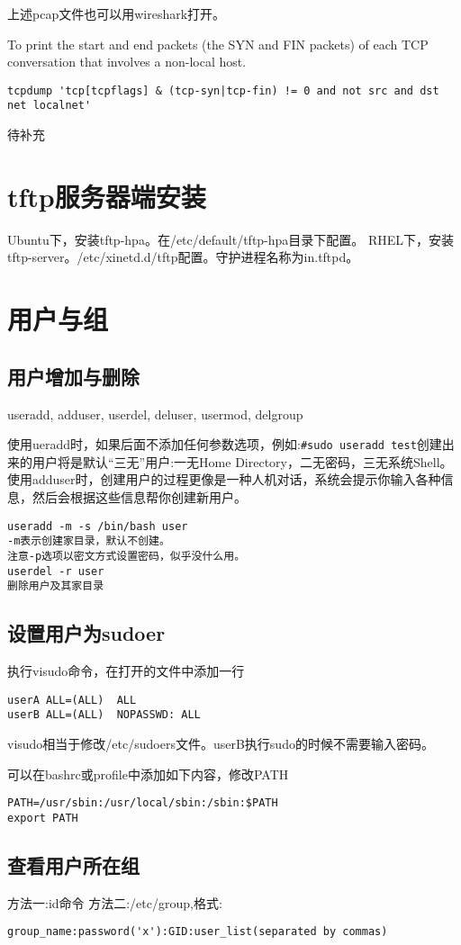 上述pcap文件也可以用wireshark打开。


 To print the start and end packets (the SYN and FIN packets) of each TCP conversation that involves a non-local host.
\begin{verbatim}
tcpdump 'tcp[tcpflags] & (tcp-syn|tcp-fin) != 0 and not src and dst net localnet'
\end{verbatim}

待补充
\section{tftp服务器端安装}
Ubuntu下，安装tftp-hpa。在/etc/default/tftp-hpa目录下配置。
RHEL下，安装tftp-server。/etc/xinetd.d/tftp配置。守护进程名称为in.tftpd。
\section{用户与组}

\subsection{用户增加与删除}
useradd, adduser, userdel, deluser, usermod, delgroup

使用ueradd时，如果后面不添加任何参数选项，例如:\verb+#sudo useradd test+创建出来的用户将是默认“三无”用户:一无Home Directory，二无密码，三无系统Shell。
使用adduser时，创建用户的过程更像是一种人机对话，系统会提示你输入各种信息，然后会根据这些信息帮你创建新用户。
\begin{verbatim}
useradd -m -s /bin/bash user 
-m表示创建家目录，默认不创建。
注意-p选项以密文方式设置密码，似乎没什么用。
userdel -r user
删除用户及其家目录
\end{verbatim}

\subsection{设置用户为sudoer}
执行visudo命令，在打开的文件中添加一行
\begin{verbatim}
userA ALL=(ALL)  ALL
userB ALL=(ALL)  NOPASSWD: ALL
\end{verbatim}
visudo相当于修改/etc/sudoers文件。userB执行sudo的时候不需要输入密码。

可以在bashrc或profile中添加如下内容，修改PATH
\begin{verbatim}
PATH=/usr/sbin:/usr/local/sbin:/sbin:$PATH
export PATH
\end{verbatim}

\subsection{查看用户所在组}
方法一:id命令
方法二:/etc/group,格式:
\begin{verbatim}
group_name:password('x'):GID:user_list(separated by commas)
\end{verbatim}

